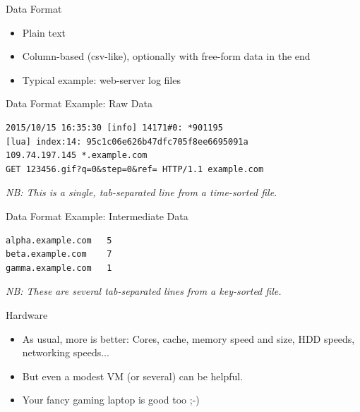 \documentclass[handout]{beamer}
\begin{document}

\begin{frame}{Data Format}

\begin{itemize}
\item Plain text
\item Column-based (csv-like), optionally with free-form data in the end
\item Typical example: web-server log files
\end{itemize}

\end{frame}


\begin{frame}[fragile]{Data Format Example: Raw Data}

\begin{verbatim}
2015/10/15 16:35:30 [info] 14171#0: *901195
[lua] index:14: 95c1c06e626b47dfc705f8ee6695091a
109.74.197.145 *.example.com
GET 123456.gif?q=0&step=0&ref= HTTP/1.1 example.com
\end{verbatim}
\textit{NB: This is a single, tab-separated line from a time-sorted file.}

\end{frame}


\begin{frame}[fragile]{Data Format Example: Intermediate Data}

\begin{verbatim}
alpha.example.com	5
beta.example.com	7
gamma.example.com	1
\end{verbatim}

\textit{NB: These are several tab-separated lines from a key-sorted file.}

\end{frame}


\begin{frame}{Hardware}

\begin{itemize}
\item As usual, more is better: Cores, cache, memory speed and size,
      HDD speeds, networking speeds...
\item But even a modest VM (or several) can be helpful.
\item Your fancy gaming laptop is good too ;-)
\end{itemize}

\end{frame}
\end{document}
